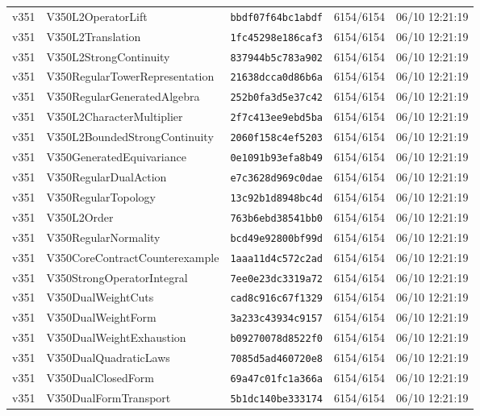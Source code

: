 \documentclass[11pt]{article}
\theoremstyle{definition}\newtheorem{deriv}{Derivation}
\begin{document}
{\begin{longtable}{@{}lllll@{}}
v351 & V350L2OperatorLift & \texttt{bbdf07f64bc1abdf} & 6154/6154 & 06/10 12:21:19 \\
v351 & V350L2Translation & \texttt{1fc45298e186caf3} & 6154/6154 & 06/10 12:21:19 \\
v351 & V350L2StrongContinuity & \texttt{837944b5c783a902} & 6154/6154 & 06/10 12:21:19 \\
v351 & V350RegularTowerRepresentation & \texttt{21638dcca0d86b6a} & 6154/6154 & 06/10 12:21:19 \\
v351 & V350RegularGeneratedAlgebra & \texttt{252b0fa3d5e37c42} & 6154/6154 & 06/10 12:21:19 \\
v351 & V350L2CharacterMultiplier & \texttt{2f7c413ee9ebd5ba} & 6154/6154 & 06/10 12:21:19 \\
v351 & V350L2BoundedStrongContinuity & \texttt{2060f158c4ef5203} & 6154/6154 & 06/10 12:21:19 \\
v351 & V350GeneratedEquivariance & \texttt{0e1091b93efa8b49} & 6154/6154 & 06/10 12:21:19 \\
v351 & V350RegularDualAction & \texttt{e7c3628d969c0dae} & 6154/6154 & 06/10 12:21:19 \\
v351 & V350RegularTopology & \texttt{13c92b1d8948bc4d} & 6154/6154 & 06/10 12:21:19 \\
v351 & V350L2Order & \texttt{763b6ebd38541bb0} & 6154/6154 & 06/10 12:21:19 \\
v351 & V350RegularNormality & \texttt{bcd49e92800bf99d} & 6154/6154 & 06/10 12:21:19 \\
v351 & V350CoreContractCounterexample & \texttt{1aaa11d4c572c2ad} & 6154/6154 & 06/10 12:21:19 \\
v351 & V350StrongOperatorIntegral & \texttt{7ee0e23dc3319a72} & 6154/6154 & 06/10 12:21:19 \\
v351 & V350DualWeightCuts & \texttt{cad8c916c67f1329} & 6154/6154 & 06/10 12:21:19 \\
v351 & V350DualWeightForm & \texttt{3a233c43934c9157} & 6154/6154 & 06/10 12:21:19 \\
v351 & V350DualWeightExhaustion & \texttt{b09270078d8522f0} & 6154/6154 & 06/10 12:21:19 \\
v351 & V350DualQuadraticLaws & \texttt{7085d5ad460720e8} & 6154/6154 & 06/10 12:21:19 \\
v351 & V350DualClosedForm & \texttt{69a47c01fc1a366a} & 6154/6154 & 06/10 12:21:19 \\
v351 & V350DualFormTransport & \texttt{5b1dc140be333174} & 6154/6154 & 06/10 12:21:19 \\

\end{longtable}}
\end{document}
